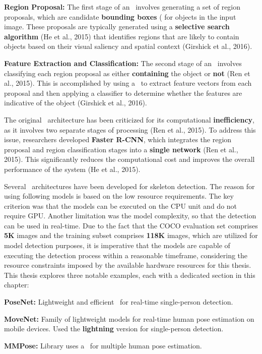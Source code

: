 \startitemize[1]
    \item {\bf Region Proposal:} The first stage of an \RCNN\ involves generating a set of region proposals, which are candidate {\bf bounding boxes} (\BBOX\) for objects in the input image. These proposals are typically generated using a {\bf selective search algorithm} (\scc He et al., 2015) that identifies regions that are likely to contain objects based on their visual saliency and spatial context (\scc Girshick et al., 2016).
    \item {\bf Feature Extraction and Classification:} The second stage of an \RCNN\ involves classifying each region proposal as either {\bf containing} the object or {\bf not} (\scc Ren et al., 2015). This is accomplished by using a \CNN\ to extract feature vectors from each proposal and then applying a classifier to determine whether the features are indicative of the object (\scc Girshick et al., 2016).
\stopitemize

The original \RCNN\ architecture has been criticized for its computational {\bf inefficiency}, as it involves two separate stages of processing (\scc Ren et al., 2015). To address this issue, researchers developed {\bf Faster R-CNN}, which integrates the region proposal and region classification stages into a {\bf single network} (\scc Ren et al., 2015). This significantly reduces the computational cost and improves the overall performance of the system (\scc He et al., 2015).

Several \NN\ architectures have been developed for skeleton detection. The reason for using following models is based on the low resource requirements. The key criterion was that the models can be executed on the CPU unit and do not require GPU. Another limitation was the model complexity, so that the detection can be used in real-time. Due to the fact that the COCO evaluation set comprises {\bf 5K} images and the training subset comprises {\bf 118K} images, which are utilized for model detection purposes, it is imperative that the models are capable of executing the detection process within a reasonable timeframe, considering the resource constraints imposed by the available hardware resources for this thesis. This thesis explores three notable examples, each with a dedicated section in this chapter:

\startitemize[n]
    \item {\bf PoseNet:} Lightweight and efficient \CNN\ for real-time single-person detection.
    \item {\bf MoveNet:} Family of lightweight models for real-time human pose estimation on mobile devices. Used the {\bf lightning} version for single-person detection.
    \item {\bf MMPose:} Library uses a \CNN\ for multiple human pose estimation.
\stopitemize

